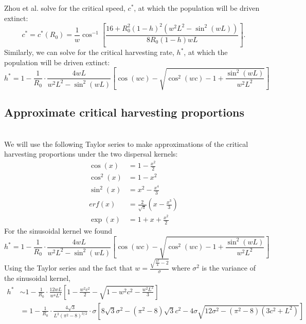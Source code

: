\documentclass[12pt,english]{article}
\begin{document}
Zhou et al. \citep{ZhouKot2011} solve for the critical speed, $c^*$, at which the population will be driven extinct:
$$c^*=c^*(R_0)=\frac{1}{w}\cos^{-1}\left[\frac{16+R_0^2(1-h)^2(w^2L^2-\sin^2(wL))}{8R_0(1-h)wL}\right].$$
Similarly, we can solve for the critical harvesting rate, $h^*$, at which the population will be driven extinct:
$$
h^*=1-\frac{1}{R_0}\cdot\frac{4wL}{w^2L^2-\sin^2(wL)}\left[\cos(wc)-\sqrt{\cos^2(wc)-1+\frac{\sin^2(wL)}{w^2L^2}}\right] 
$$

\subsection{Approximate critical harvesting proportions \label{approxcrit}}
~\\We will use the following Taylor series to make approximations of the critical harvesting proportions under the two dispersal kernels:
\begin{align*}
\cos(x)&=1-\frac{x^2}{2}
\\ \cos^2(x)&=1-x^2
\\ \sin^2(x)&=x^2-\frac{x^4}{3}
\\ erf(x)&=\frac{2}{\sqrt{\pi}}(x-\frac{x^3}{3})
\\ \exp(x)&=1+x+\frac{x^2}{2}
\end{align*}
For the sinusoidal kernel we found 
\begin{equation}
h^*=1-\frac{1}{R_0}\cdot\frac{4wL}{w^2L^2-\sin^2(wL)}\left[\cos(wc)-\sqrt{\cos^2(wc)-1+\frac{\sin^2(wL)}{w^2L^2}}\right] 
\end{equation} 
Using the Taylor series and the fact that $w=\frac{\sqrt{\frac{\pi^2}{4}-2}}{\sigma}$ where $\sigma^2$ is the variance of the sinusoidal kernel,
\begin{align*}
h^*&\sim 1-\frac{1}{R_0}\cdot\frac{12wL}{w^4L^4}\left[1-\frac{w^2c^2}{2}-\sqrt{1-w^2c^2-\frac{w^2L^2}{3}}\right]
\\&=1-\frac{1}{R_0}\cdot\frac{4\sqrt{3}}{L^3(\pi^2-8)^{3/2}}\cdot\sigma\left[8\sqrt{3}\sigma^2-(\pi^2-8)\sqrt{3}c^2-4\sigma\sqrt{12\sigma^2-(\pi^2-8)(3c^2+L^2)}\right]
\end{align*}
\end{document}
